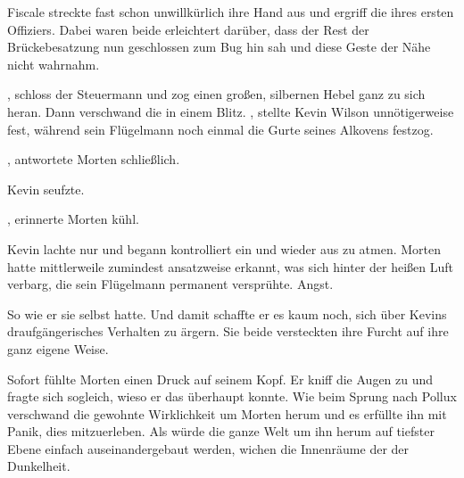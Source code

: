 \par

Fiscale streckte fast schon unwillkürlich ihre Hand aus und ergriff die ihres ersten Offiziers. Dabei waren beide erleichtert darüber, dass der Rest der Brückebesatzung nun geschlossen zum Bug hin sah und diese Geste der Nähe nicht wahrnahm.

\par

, schloss der Steuermann und zog einen großen, silbernen Hebel ganz zu sich heran. Dann verschwand die  in einem Blitz.
\ortswechsel
{}, stellte Kevin Wilson unnötigerweise fest, während sein Flügelmann noch einmal die Gurte seines Alkovens festzog.

\par

, antwortete Morten schließlich.

\par

Kevin seufzte. 

\par

, erinnerte Morten kühl.

\par

Kevin lachte nur und begann kontrolliert ein und wieder aus zu atmen. Morten hatte mittlerweile zumindest ansatzweise erkannt, was sich hinter der heißen Luft verbarg, die sein Flügelmann permanent versprühte. Angst.

\par

So wie er sie selbst hatte. Und damit schaffte er es kaum noch, sich über Kevins draufgängerisches Verhalten zu ärgern. Sie beide versteckten ihre Furcht auf ihre ganz eigene Weise.

\par


\par

Sofort fühlte Morten einen Druck auf seinem Kopf. Er kniff die Augen zu und fragte sich sogleich, wieso er das überhaupt konnte. Wie beim Sprung nach Pollux verschwand die gewohnte Wirklichkeit um Morten herum und es erfüllte ihn mit Panik, dies mitzuerleben. Als würde die ganze Welt um ihn herum auf tiefster Ebene einfach auseinandergebaut werden, wichen die Innenräume der  der Dunkelheit.

